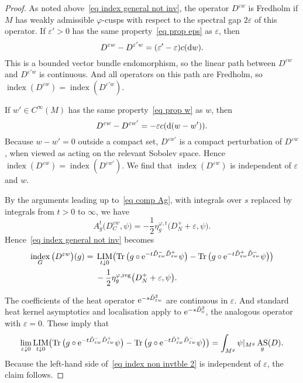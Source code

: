 \documentclass[pdftex]{sigma}%
\numberwithin{equation}{section}
\DeclareMathOperator{\Tr}{Tr}
\DeclareMathOperator{\AS}{AS}
\DeclareMathOperator{\ind}{index}
\DeclareMathOperator{\reg}{reg}
\DeclareMathOperator{\LIM}{LIM}
\begin{document}
\begin{proof}
As noted above~\eqref{eq index general not inv}, the operator $D^{\varepsilon w}$ is Fredholm if $M$ has weakly admissible $\varphi$-cusps with respect to the spectral gap $2\varepsilon$ of this operator.
If $\varepsilon'>0$ has the same property~\eqref{eq prop eps} as $\varepsilon$, then
\[
D^{\varepsilon w} - D^{\varepsilon' w} = (\varepsilon' - \varepsilon)c({\rm d}w).
\]
This is a bounded vector bundle endomorphism, so the linear path between $D^{\varepsilon w}$ and $D^{\varepsilon' w}$ is continuous. And all operators on this path are Fredholm, so $\ind(D^{\varepsilon w}) =\ind(D^{\varepsilon' w})$.

If $w' \in C^{\infty}(M)$ has the same property~\eqref{eq prop w} as $w$, then
\[
D^{\varepsilon w} - D^{\varepsilon w'} = - \varepsilon c({\rm d}(w-w')).
\]
Because $w-w' = 0$ outside a compact set, $D^{\varepsilon w'}$ is a compact perturbation of $D^{\varepsilon w}$, when viewed as acting on the relevant Sobolev space. Hence $\ind(D^{\varepsilon w}) =\ind(D^{\varepsilon w'})$. We find that $\ind(D^{\varepsilon w})$ is independent of $\varepsilon$ and $w$.

By the arguments leading up to~\eqref{eq comp Ag}, with integrals over $s$ replaced by integrals from $t>0$ to $\infty$, we have
\[
A_{g}^t\big(D_C^{\varepsilon w}, \psi\big) = -\frac{1}{2}\eta_g^{\varphi, t}\big(D_N^+ + \varepsilon, \psi\big).
\]
Hence~\eqref{eq index general not inv} becomes
\begin{align}
 \ind_G\big(D^{\varepsilon w}\big)(g) ={}& \LIM_{t\downarrow 0} \bigl(
 \Tr\big(g\circ {\rm e}^{-t\tilde D^-_{\varepsilon w} \tilde D^+_{\varepsilon w}}\psi\big) - \Tr\big(g\circ {\rm e}^{-t\tilde D^+_{\varepsilon w} \tilde D^-_{\varepsilon w}}\psi\big) \bigr) \nonumber
 \\
 &-\frac{1}{2}\eta_g^{\varphi, \reg}\big(D_N^+ + \varepsilon, \psi\big).
\label{eq index non invtble 2}
\end{align}

The coefficients of the heat operator ${\rm e}^{-s \tilde D_{\varepsilon w}^2}$ are continuous in $\varepsilon$. And standard heat kernel asymptotics and localisation apply to ${\rm e}^{-s \tilde D_0^2}$, the analogous operator with $\varepsilon = 0$. These imply that
\[
\lim_{\varepsilon \downarrow 0} \LIM_{t\downarrow 0} \bigl(
 \Tr\big(g\circ {\rm e}^{-t\tilde D^-_{\varepsilon w} \tilde D^+_{\varepsilon w}}\psi\big) - \Tr\big(g\circ {\rm e}^{-t\tilde D^+_{\varepsilon w} \tilde D^-_{\varepsilon w}}\psi\big) \bigr) = \int_{M^g} \psi|_{M^g} \AS_g(D).
\]
Because the left-hand side of~\eqref{eq index non invtble 2} is independent of $\varepsilon$, the claim follows.
\end{proof}
\end{document}
